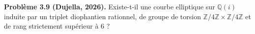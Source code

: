 \textbf{Problème 3.9 (Dujella, 2026).} Existe-t-il une courbe elliptique sur $\mathbb{Q}(i)$ induite par un triplet diophantien rationnel, de groupe de torsion $\mathbb{Z}/4\mathbb{Z}\times\mathbb{Z}/4\mathbb{Z}$ et de rang strictement supérieur à 6 ?
